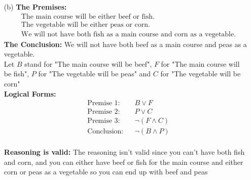 \documentclass{article} %
\begin{document}
\begin{enumerate}
\begin{itemize}
            \item[(b)] \textbf{The Premises:}
            \begin{align*}
                &\text{The main course will be either beef or fish.} \\
                &\text{The vegetable will be either peas or corn.} \\
                &\text{We will not have both fish as a main course and corn as a vegetable.}
            \end{align*}
            \textbf{The Conclusion:} We will not have both beef as a main course and peas as a vegetable. \\
            Let \(B\) stand for "The main course will be beef", \(F\) for "The main course will be fish", \(P\) for "The vegetable will be peas" and \(C\) for "The vegetable will be corn" \\
            \textbf{Logical Forms:}
            \begin{align*}
                &\text{Premise 1:} && B \vee F \\
                &\text{Premise 2:} && P \vee C \\
                &\text{Premise 3:} && \neg (F \wedge C) \\
                &\text{Conclusion:} && \neg (B \wedge P) 
            \end{align*} \\
            \textbf{Reasoning is valid:} The reasoning isn't valid since you can't have both fish and corn, and you can either have beef or fish for the main course and either corn or peas as a vegetable so you can end up with beef and peas 


\end{itemize}
\end{enumerate}
\end{document}
